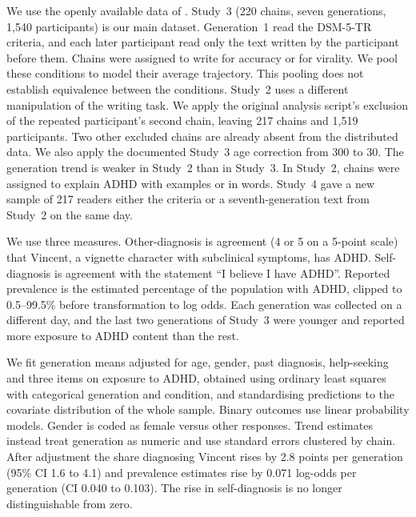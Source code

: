 \documentclass[11pt]{article}
\begin{document}
We use the openly available data of \citet{katiyar2026}. Study~3 (220 chains, seven generations, 1{,}540 participants) is our main dataset. Generation~1 read the DSM-5-TR criteria, and each later participant read only the text written by the participant before them. Chains were assigned to write for accuracy or for virality. We pool these conditions to model their average trajectory. This pooling does not establish equivalence between the conditions. Study~2 uses a different manipulation of the writing task. We apply the original analysis script's exclusion of the repeated participant's second chain, leaving 217 chains and 1{,}519 participants. Two other excluded chains are already absent from the distributed data. We also apply the documented Study~3 age correction from 300 to 30. The generation trend is weaker in Study~2 than in Study~3. In Study~2, chains were assigned to explain ADHD with examples or in words. Study~4 gave a new sample of 217 readers either the criteria or a seventh-generation text from Study~2 on the same day.

We use three measures. Other-diagnosis is agreement (4 or 5 on a 5-point scale) that Vincent, a vignette character with subclinical symptoms, has ADHD. Self-diagnosis is agreement with the statement \textquotedblleft I believe I have ADHD\textquotedblright. Reported prevalence is the estimated percentage of the population with ADHD, clipped to 0.5--99.5\% before transformation to log odds. Each generation was collected on a different day, and the last two generations of Study~3 were younger and reported more exposure to ADHD content than the rest.

We fit generation means adjusted for age, gender, past diagnosis, help-seeking and three items on exposure to ADHD, obtained using ordinary least squares with categorical generation and condition, and standardising predictions to the covariate distribution of the whole sample. Binary outcomes use linear probability models. Gender is coded as female versus other responses. Trend estimates instead treat generation as numeric and use standard errors clustered by chain. After adjustment the share diagnosing Vincent rises by 2.8 points per generation (95\% CI 1.6 to 4.1) and prevalence estimates rise by 0.071 log-odds per generation (CI 0.040 to 0.103). The rise in self-diagnosis is no longer distinguishable from zero.
\end{document}
